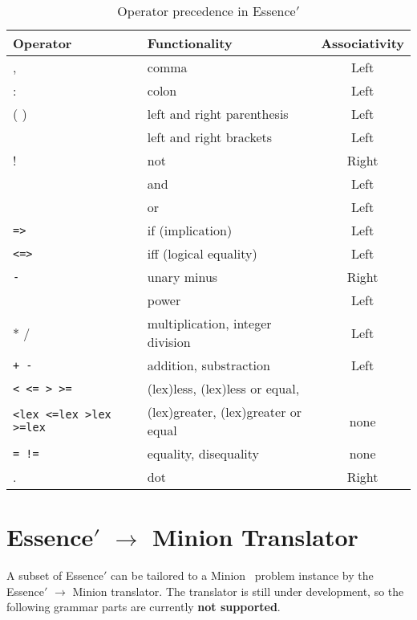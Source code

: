 \documentclass{article}
\begin{document}
\begin{table}
     \centering
    \begin{tabular}{|l|lc|}
 
      \hline
       Operator & Functionality & Associativity \\
       \hline
       \hline
       ,   & comma & Left \\   
       \hline
       :   & colon & Left \\
       \hline
       ( ) & left and right parenthesis & Left \\
       \hline
       \verb1[ ]1 & left and right brackets & Left \\
       \hline
       ! & not & Right \\  
       \hline
       \verb1/\1 & and & Left \\ 
       \hline
       \verb1\/1 & or & Left \\ 
       \hline
        {\tt =>} & if (implication)  & Left \\ 
	\hline
        {\tt <=>} & iff (logical equality) & Left \\ 
	\hline
        {\tt -} & unary minus & Right \\
	\hline
        \verb1^1 & power & Left \\ 
	\hline
        * / & multiplication, integer division & Left \\ 
	\hline
        {\tt + -} & addition, substraction &  Left \\
	\hline
        {\tt < <= > >= } & (lex)less, (lex)less or equal, &  \\ 
	{\tt <lex <=lex >lex >=lex } & (lex)greater, (lex)greater or equal & none \\ 
	\hline
        {\tt = !=} & equality, disequality & none \\
	\hline
        . & dot & Right \\ 
	\hline

      \end{tabular}
    \caption{Operator precedence in {\sc Essence}$'$}
\label{precedence}
  \end{table}

\section{{\sc Essence}$'$ $\rightarrow$ {\sc Minion} Translator}

A subset of {\sc Essence}$'$ can be tailored to a {\sc Minion}~\cite{minion} 
problem instance by the {\sc Essence}$'$ $\rightarrow$ {\sc Minion} translator.
The translator is still under development, so the
following grammar parts are currently {\bf not supported}.
\end{document}
